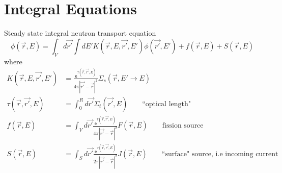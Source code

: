 \documentclass[12pt]{article}
\newcommand{\Macro}{\ensuremath{\Sigma}}
\begin{document}
\section{Integral Equations}

Steady state integral neutron transport equation
%
\begin{equation}
\phi(\vec{r}, E) = \int_V d\vec{r'} \int dE' K(\vec{r}, E, \vec{r'}, E') \phi(\vec{r'}, E') + f(\vec{r}, E) + S(\vec{r}, E) \nonumber
\end{equation}
%
where
\begin{align}
K(\vec{r}, E, \vec{r'}, E') &= \frac{\mathsf{e}^{\tau(\vec{r}, \vec{r'}, E)}}{4\pi |\vec{r'} - \vec{r}|^2} \Macro_s(\vec{r}, E' \rightarrow E) \nonumber \\
%
\tau(\vec{r}, \vec{r'}, E) &= \int_0^R d\vec{r'} \Macro_t(\vec{r'}, E) \qquad \text{``optical length"} \nonumber \\
%
f(\vec{r}, E) &= \int_V d\vec{r'}\frac{\mathsf{e}^{\tau(\vec{r}, \vec{r'}, E)}}{4\pi |\vec{r'} - \vec{r}|^2} F(\vec{r}, E) \qquad \text{fission source}\nonumber \\
%
S(\vec{r}, E) &= \int_S d\vec{r'}\frac{\mathsf{e}^{\tau(\vec{r}, \vec{r'}, E)}}{2\pi |\vec{r'} - \vec{r}|^2} J(\vec{r}, E) \qquad \text{``surface" source, i.e\ incoming current} \nonumber
\end{align}
\end{document}
